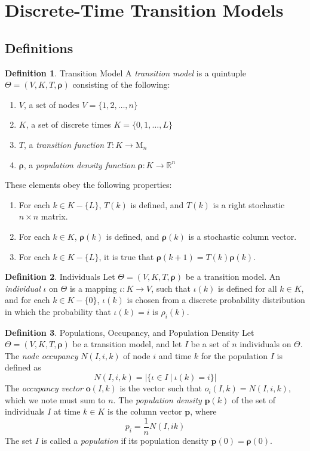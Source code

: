 \documentclass[11pt,letterpaper]{article}
\author{Kevin Smith}
\theoremstyle{definition}
\newtheorem{definition}{Definition}[section]
\begin{document}
	
	\section{Discrete-Time Transition Models}
	
	\subsection{Definitions}
	
	\theoremstyle{definition}
	\begin{definition}{Transition Model}
		A \textit{transition model} is a quintuple $\Theta = (V, K, T, \bm \rho)$ consisting of the following:
		\begin{enumerate}
			\item
			$V$, a set of nodes $V = \{1, 2, \dots, n\}$
			\item
			$K$, a set of discrete times $K = \{0, 1, \dots, L\}$
			\item
			$T$, a \textit{transition function} $T: K \rightarrow \text{M}_n$
			\item
			$\bm \rho$, a \textit{population density function} $\bm \rho: K \rightarrow \mathbb R^n$
		\end{enumerate}
		These elements obey the following properties:
		\begin{enumerate}
			\item
			For each $k \in K - \{L\}$, $T(k)$ is defined, and $T(k)$ is a right stochastic $n \times n$ matrix.
			\item
			For each $k \in K$, $\bm \rho(k)$ is defined, and $\bm \rho(k)$ is a stochastic column vector.
			\item
			For each $k \in K - \{L\}$, it is true that $\bm \rho(k + 1) = T(k) \bm \rho(k)$.
		\end{enumerate}
	\end{definition}

	\begin{definition}{Individuals}
		Let $\Theta = (V, K, T, \bm \rho)$ be a transition model. An \textit{individual} $\iota$ on $\Theta$ is a mapping $\iota: K \rightarrow V$, such that $\iota(k)$ is defined for all $k \in K$, and for each $k \in K - \{0\}$, $\iota(k)$ is chosen from a discrete probability distribution in which the probability that $\iota(k) = i$ is $\rho_i(k)$.
	\end{definition}
	
	\begin{definition}{Populations, Occupancy, and Population Density}
		Let $\Theta = (V, K, T, \bm \rho)$ be a transition model, and let $I$ be a set of $n$ individuals on $\Theta$. The \textit{node occupancy} $N(I, i, k)$ of node $i$ and time $k$ for the population $I$ is defined as
		\[
			N(I, i, k) = \left| \{\iota \in I ~|~ \iota(k) = i\} \right|
		\]
		The \textit{occupancy vector} $\bm o(I, k)$ is the vector such that $o_i(I, k) = N(I, i, k)$, which we note must sum to $n$. The \textit{population density} $\bm p(k)$ of the set of individuals $I$ at time $k \in K$ is the column vector $\bm p$, where 
		\[
			p_i = \frac 1 n N(I, i k)
		\]
		The set $I$ is called a \textit{population} if its population density $\bm p(0) = \bm \rho(0)$.
	\end{definition}
	
\end{document}
